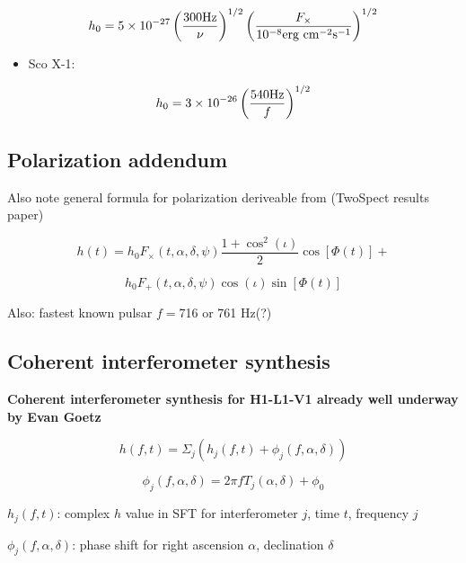 \[
h_{0}=5\times10^{-27}\left(\frac{300\textup{Hz}}{\nu}\right)^{1/2}\left(\frac{F_{\times}}{10^{-8}\textup{erg cm}^{-2}\textup{s}^{-1}}\right)^{1/2}
\]

\begin{itemize}
\item Sco X-1:
\end{itemize}

\[
h_{0}=3\times10^{-26}\left(\frac{540\textup{Hz}}{f}\right)^{1/2}
\]



\subsection{Polarization addendum}


Also note general formula for polarization deriveable from (TwoSpect
results paper)


\[
h(t)=h_{0}F_{\times}(t,\alpha,\delta,\psi)\frac{1+\cos^{2}(\iota)}{2}\cos[\Phi(t)]+
\]



\[
h_{0}F_{+}(t,\alpha,\delta,\psi)\cos(\iota)\sin[\Phi(t)]
\]



Also: fastest known pulsar $f=$716 or 761 Hz(?)



\subsection{Coherent interferometer synthesis}


\textbf{Coherent interferometer synthesis for H1-L1-V1 already well underway by Evan Goetz}


\[
h(f,t)=\Sigma_{j}\left(h_{j}(f,t)+\phi_{j}(f,\alpha,\delta)\right)
\]



\[
\phi_{j}(f,\alpha,\delta)=2\pi fT_{j}(\alpha,\delta)+\phi_{0}
\]



\emph{$h_{j}(f,t)$}: complex $h$ value in SFT for interferometer
$j$, time $t$, frequency $j$


$\phi_{j}(f,\alpha,\delta)$: phase shift for right ascension $\alpha$,
declination $\delta$


